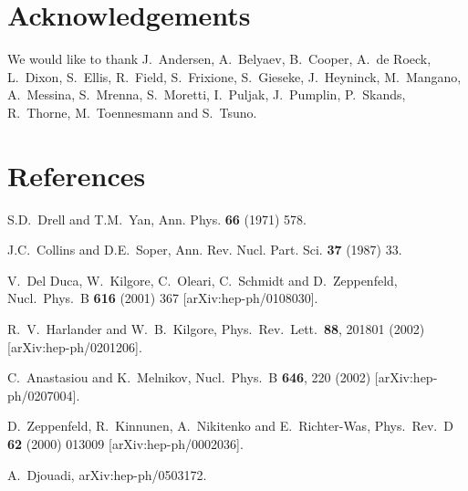 \documentclass[12pt]{iopart}
\begin{document}
\section*{Acknowledgements}

We would like to thank J.~Andersen, A.~Belyaev, B.~Cooper, A.~de Roeck, L.~Dixon, S.~Ellis, R.~Field, S.~Frixione, S.~Gieseke,
J.~Heyninck, M.~Mangano, A.~Messina, S.~Mrenna, S.~Moretti, I.~Puljak, J.~Pumplin, P.~Skands, R.~Thorne, M.~Toennesmann and S.~Tsuno.  

\section*{References}

\begin{thebibliography}{99}

S.D.~Drell and T.M.~Yan, Ann. Phys. {\bf 66} (1971) 578.

J.C.~Collins and D.E.~Soper, Ann. Rev. Nucl. Part. Sci. {\bf 37} (1987) 33.


  V.~Del Duca, W.~Kilgore, C.~Oleari, C.~Schmidt and D.~Zeppenfeld,
  Nucl.\ Phys.\ B {\bf 616} (2001) 367 
  [arXiv:hep-ph/0108030].

  R.~V.~Harlander and W.~B.~Kilgore,
  Phys.\ Rev.\ Lett.\  {\bf 88}, 201801 (2002)
  [arXiv:hep-ph/0201206].
  
  C.~Anastasiou and K.~Melnikov,
  Nucl.\ Phys.\ B {\bf 646}, 220 (2002)
  [arXiv:hep-ph/0207004].

 D.~Zeppenfeld, R.~Kinnunen, A.~Nikitenko and E.~Richter-Was,
 Phys.\ Rev.\ D {\bf 62} (2000) 013009
 [arXiv:hep-ph/0002036].

  A.~Djouadi,
  arXiv:hep-ph/0503172.


\end{thebibliography}
\end{document}
